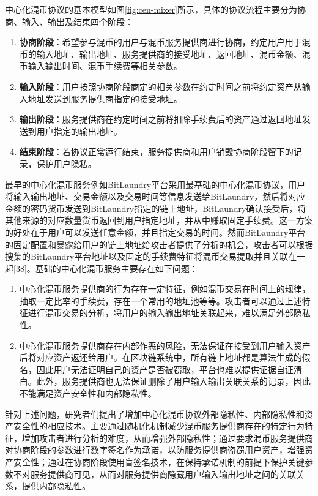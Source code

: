 中心化混币协议的基本模型如图\ref{fig:cen-mixer}所示，具体的协议流程主要分为协商、输入、输出及结束四个阶段：

\begin{enumerate}
	\item \textbf{协商阶段}：希望参与混币的用户与混币服务提供商进行协商，约定用户用于混币的输入地址、输出地址、服务提供商的接受地址、返回地址、混币金额、混币输入输出时间、混币手续费等相关参数。
	\item \textbf{输入阶段}：用户按照协商阶段商定的相关参数在约定时间之前将约定资产从输入地址发送到服务提供商指定的接受地址。
	\item \textbf{输出阶段}：服务提供商在约定时间之前将扣除手续费后的资产通过返回地址发送到用户指定的输出地址。
	\item \textbf{结束阶段}：若协议正常运行结束，服务提供商和用户销毁协商阶段留下的记录，保护用户隐私。
\end{enumerate}

最早的中心化混币服务例如BitLaundry平台采用最基础的中心化混币协议，用户将输入输出地址、交易金额以及交易时间等信息发送给BitLaundry，然后将对应金额的密码货币发送到BitLaundry指定的链上地址，BitLaundry确认接受后，将其他来源的对应数量货币返回到用户指定地址，并从中赚取固定手续费。这一方案的好处在于用户可以发送任意金额，并且指定交易的时间。然而BitLaundry平台的固定配置和暴露给用户的链上地址给攻击者提供了分析的机会，攻击者可以根据搜集的BitLaundry平台地址以及固定的手续费特征将混币交易提取并且关联在一起[38]。基础的中心化混币服务主要存在如下问题：

\begin{enumerate}
	\item 中心化混币服务提供商的行为存在一定特征，例如混币交易在时间上的规律，抽取一定比率的手续费，存在一个常用的地址池等等。攻击者可以通过上述特征进行混币交易的分析，将用户的输入输出地址关联起来，难以满足外部隐私性。
	\item 中心化混币服务提供商存在内部作恶的风险，无法保证在接受到用户输入资产后将对应资产返还给用户。在区块链系统中，所有链上地址都是算法生成的假名，因此用户无法证明自己的资产是否被窃取，平台也难以提供证据自证清白。此外，服务提供商也无法保证删除了用户输入输出关联关系的记录，因此不能满足资产安全性和内部隐私性。
\end{enumerate}
	
针对上述问题，研究者们提出了增加中心化混币协议外部隐私性、内部隐私性和资产安全性的相应技术。主要通过随机化机制减少混币服务提供商存在的特定行为特征，增加攻击者进行分析的难度，从而增强外部隐私性；通过要求混币服务提供商对协商阶段的参数进行数字签名作为承诺，以防服务提供商盗窃用户资产，增强资产安全性；通过在协商阶段使用盲签名技术，在保持承诺机制的前提下保护关键参数不对服务提供商可见，从而对服务提供商隐藏用户输入输出地址之间的关联关系，提供内部隐私性。


